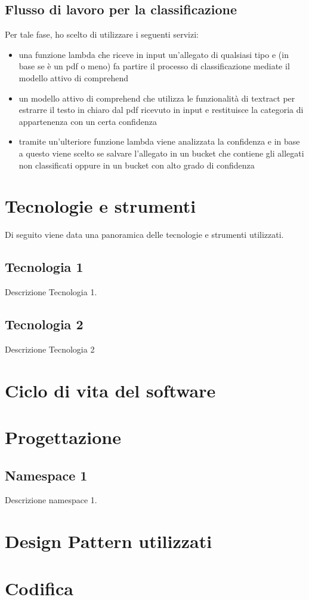 \subsection{Flusso di lavoro per la classificazione}
\label{subsec:classificazione}
Per tale fase, ho scelto di utilizzare i seguenti servizi:
\begin{itemize}
    \item una funzione lambda che riceve in input un'allegato di qualsiasi tipo e (in base se è un pdf o meno) fa partire il processo di classificazione mediate il modello attivo di comprehend
    \item un modello attivo di comprehend che utilizza le funzionalità di textract per estrarre il testo in chiaro dal pdf ricevuto in input e restituisce la categoria di appartenenza con un certa confidenza
    \item tramite un'ulteriore funzione lambda viene analizzata la confidenza e in base a questo viene scelto se salvare l'allegato in un bucket che contiene gli allegati non classificati oppure in un bucket con alto grado di confidenza
\end{itemize}
\section{Tecnologie e strumenti}
\label{sec:tecnologie-strumenti}

Di seguito viene data una panoramica delle tecnologie e strumenti utilizzati.

\subsection*{Tecnologia 1}
Descrizione Tecnologia 1.

\subsection*{Tecnologia 2}
Descrizione Tecnologia 2

\section{Ciclo di vita del software}
\label{sec:ciclo-vita-software}

\section{Progettazione}
\label{sec:progettazione}

\subsection{Namespace 1} %
Descrizione namespace 1.

\begin{namespacedesc}
\end{namespacedesc}


\section{Design Pattern utilizzati}

\section{Codifica}
